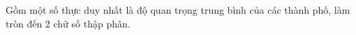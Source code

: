 Gồm một số thực duy nhất là độ quan trọng trung bình của các thành phố, làm tròn đến 2 chữ số thập phân.

\